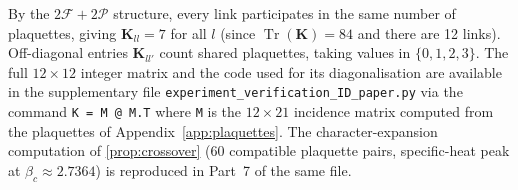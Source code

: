 \documentclass[12pt, a4paper]{article}
\theoremstyle{plain}
\theoremstyle{definition}
\theoremstyle{remark}
\newcommand{\FS}{\mathcal{F}}
\newcommand{\PS}{\mathcal{P}}
\newcommand{\Cstar}{\beta_c}
\newcommand{\Kmat}{\mathbf{K}}
\newcommand{\Tr}{\operatorname{Tr}}
\begin{document}
By the $2\FS+2\PS$ structure, every link participates in the
same number of plaquettes, giving $\Kmat_{ll}=7$ for all $l$
(since $\Tr(\Kmat)=84$ and there are 12 links).
Off-diagonal entries $\Kmat_{ll'}$ count shared plaquettes,
taking values in $\{0,1,2,3\}$.
The full $12\times12$ integer matrix and the code used for its
diagonalisation are available in the supplementary file
\texttt{experiment\_verification\_ID\_paper.py} via the command
\texttt{K = M @ M.T} where \texttt{M} is the $12\times21$
incidence matrix computed from the plaquettes of
Appendix~\ref{app:plaquettes}.
The character-expansion computation of \cref{prop:crossover}
(60 compatible plaquette pairs, specific-heat peak at
$\Cstar\approx 2.7364$) is reproduced in Part~7 of the same file.
\end{document}
